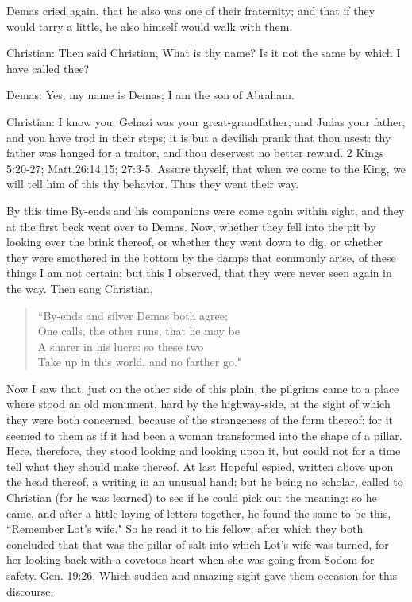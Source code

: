 Demas cried again, that he also was one of their fraternity; and that if they would tarry a little, he also himself would walk with them.

Christian: Then said Christian, What is thy name? Is it not the same by which I have called thee?

Demas: Yes, my name is Demas; I am the son of Abraham.

Christian: I know you; Gehazi was your great-grandfather, and Judas your father, and you have trod in their steps; it is but a devilish prank that thou usest: thy father was hanged for a traitor, and thou deservest no better reward. 2 Kings 5:20-27; Matt.26:14,15; 27:3-5. Assure thyself, that when we come to the King, we will tell him of this thy behavior. Thus they went their way.

By this time By-ends and his companions were come again within sight, and they at the first beck went over to Demas. Now, whether they fell into the pit by looking over the brink thereof, or whether they went down to dig, or whether they were smothered in the bottom by the damps that commonly arise, of these things I am not certain; but this I observed, that they were never seen again in the way. Then sang Christian,
\begin{verse} 
``By-ends and silver Demas both agree;\\
One calls, the other runs, that he may be\\
A sharer in his lucre: so these two\\
Take up in this world, and no farther go."\\
\end{verse}
Now I saw that, just on the other side of this plain, the pilgrims came to a place where stood an old monument, hard by the highway-side, at the sight of which they were both concerned, because of the strangeness of the form thereof; for it seemed to them as if it had been a woman transformed into the shape of a pillar. Here, therefore, they stood looking and looking upon it, but could not for a time tell what they should make thereof. At last Hopeful espied, written above upon the head thereof, a writing in an unusual hand; but he being no scholar, called to Christian (for he was learned) to see if he could pick out the meaning: so he came, and after a little laying of letters together, he found the same to be this, ``Remember Lot's wife." So he read it to his fellow; after which they both concluded that that was the pillar of salt into which Lot's wife was turned, for her looking back with a covetous heart when she was going from Sodom for safety. Gen. 19:26. Which sudden and amazing sight gave them occasion for this discourse.

